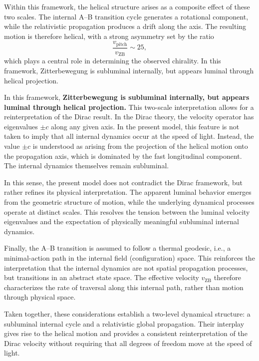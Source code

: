\documentclass[%
 reprint, amsmath,amssymb, aps, prb, ]{revtex4-2}
\numberwithin{equation}{section}
\begin{document}
Within this framework, the helical structure arises as a composite effect of these two scales. The internal A--B transition cycle generates a rotational component, while the relativistic propagation produces a drift along the axis. The resulting motion is therefore helical, with a strong asymmetry set by the ratio
\begin{equation}
\frac{v_{\mathrm{pitch}}}{v_{\mathrm{ZB}}} \sim 25,
\end{equation}
which plays a central role in determining the observed chirality. In this framework, Zitterbewegung is subluminal internally, but appears luminal through helical projection.

In this framework, \textbf{Zitterbewegung is subluminal internally, but appears luminal through helical projection.} This two-scale interpretation allows for a reinterpretation of the Dirac result. In the Dirac theory, the velocity operator has eigenvalues $\pm c$ along any given axis. In the present model, this feature is not taken to imply that all internal dynamics occur at the speed of light. Instead, the value $\pm c$ is understood as arising from the projection of the helical motion onto the propagation axis, which is dominated by the fast longitudinal component. The internal dynamics themselves remain subluminal.

In this sense, the present model does not contradict the Dirac framework, but rather refines its physical interpretation. The apparent luminal behavior emerges from the geometric structure of motion, while the underlying dynamical processes operate at distinct scales. This resolves the tension between the luminal velocity eigenvalues and the expectation of physically meaningful subluminal internal dynamics.

Finally, the A--B transition is assumed to follow a thermal geodesic, i.e., a minimal-action path in the internal field (configuration) space. This reinforces the interpretation that the internal dynamics are not spatial propagation processes, but transitions in an abstract state space. The effective velocity $v_{\mathrm{ZB}}$ therefore characterizes the rate of traversal along this internal path, rather than motion through physical space.

Taken together, these considerations establish a two-level dynamical structure: a subluminal internal cycle and a relativistic global propagation. Their interplay gives rise to the helical motion and provides a consistent reinterpretation of the Dirac velocity without requiring that all degrees of freedom move at the speed of light.
\end{document}
